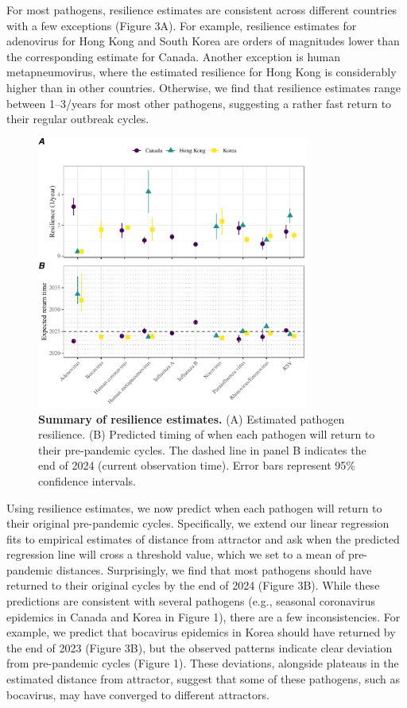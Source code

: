 \documentclass[12pt]{article}
\begin{document}
For most pathogens, resilience estimates are consistent across different countries with a few exceptions (Figure 3A).
For example, resilience estimates for adenovirus for Hong Kong and South Korea are orders of magnitudes lower than the corresponding estimate for Canada.
Another exception is human metapneumovirus, where the estimated resilience for Hong Kong is considerably higher than in other countries.
Otherwise, we find that resilience estimates range between 1--3/years for most other pathogens, suggesting a rather fast return to their regular outbreak cycles.

\begin{figure}[!th]
\begin{center}
\includegraphics[width=0.8\textwidth]{../figure3/figure3.pdf}
\caption{
\textbf{Summary of resilience estimates.}
(A) Estimated pathogen resilience.
(B) Predicted timing of when each pathogen will return to their pre-pandemic cycles.
The dashed line in panel B indicates the end of 2024 (current observation time).
Error bars represent 95\% confidence intervals.
}
\end{center}
\end{figure}

Using resilience estimates, we now predict when each pathogen will return to their original pre-pandemic cycles.
Specifically, we extend our linear regression fits to empirical estimates of distance from attractor and ask when the predicted regression line will cross a threshold value, which we set to a mean of pre-pandemic distances.
Surprisingly, we find that most pathogens should have returned to their original cycles by the end of 2024 (Figure 3B).
While these predictions are consistent with several pathogens (e.g., seasonal coronavirus epidemics in Canada and Korea in Figure 1),
there are a few inconsistencies.
For example, we predict that bocavirus epidemics in Korea should have returned by the end of 2023 (Figure 3B), but the observed patterns indicate clear deviation from pre-pandemic cycles (Figure 1).
These deviations, alongside plateaus in the estimated distance from attractor, suggest that some of these pathogens, such as bocavirus, may have converged to different attractors.
\end{document}
